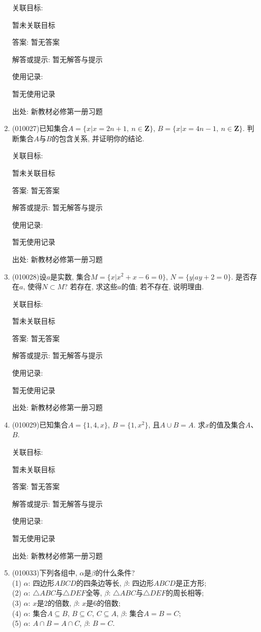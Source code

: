 \documentclass[10pt,a4paper]{article}
\begin{document}
\begin{enumerate}[1.]
关联目标:

暂未关联目标

答案: 暂无答案

解答或提示: 暂无解答与提示

使用记录:

暂无使用记录


出处: 新教材必修第一册习题
\item { (010027)}已知集合$A=\{x|x=2n+1,\ n\in \mathbf{Z}\}$, $B=\{x|x=4n-1,\ n\in \mathbf{Z}\}$. 判断集合$A$与$B$的包含关系, 并证明你的结论.


关联目标:

暂未关联目标

答案: 暂无答案

解答或提示: 暂无解答与提示

使用记录:

暂无使用记录


出处: 新教材必修第一册习题
\item { (010028)}设$a$是实数, 集合$M=\{x|x^2+x-6=0\}$, $N=\{y|ay+2=0\}$. 是否存在$a$, 使得$N\subset M$? 若存在, 求这些$a$的值; 若不存在, 说明理由.


关联目标:

暂未关联目标

答案: 暂无答案

解答或提示: 暂无解答与提示

使用记录:

暂无使用记录


出处: 新教材必修第一册习题
\item { (010029)}已知集合$A=\{1, 4, x\}$, $B=\{1, x^2\}$, 且$A\cup B=A$. 求$x$的值及集合$A$、$B$.


关联目标:

暂未关联目标

答案: 暂无答案

解答或提示: 暂无解答与提示

使用记录:

暂无使用记录


出处: 新教材必修第一册习题
\item { (010033)}下列各组中, $\alpha$是$\beta$的什么条件?\\
(1) $\alpha$: 四边形$ABCD$的四条边等长, $\beta$: 四边形$ABCD$是正方形;\\
(2) $\alpha$: $\triangle ABC$与$\triangle DEF$全等, $\beta$: $\triangle ABC$与$\triangle DEF$的周长相等;\\
(3) $\alpha$: $x$是$2$的倍数, $\beta$: $x$是$6$的倍数;\\
(4) $\alpha$: 集合$A\subseteq B$, $B\subseteq C$, $C\subseteq A$, $\beta$: 集合$A=B=C$;\\
(5) $\alpha$: $A\cap B=A\cap C$, $\beta$: $B=C$.



\end{enumerate}
\end{document}
